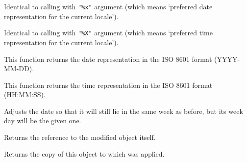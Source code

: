 


\label{wxdatetimeformatdate}


Identical to calling  with {\tt "\%x"}
argument (which means `preferred date representation for the current locale').


\label{wxdatetimeformattime}


Identical to calling  with {\tt "\%X"}
argument (which means `preferred time representation for the current locale').


\label{wxdatetimeformatisodate}


This function returns the date representation in the ISO 8601 format
(YYYY-MM-DD).


\label{wxdatetimeformatisotime}


This function returns the time representation in the ISO 8601 format
(HH:MM:SS).



\label{wxdatetimesettoweekdayinsameweek}


Adjusts the date so that it will still lie in the same week as before, but its
week day will be the given one.

Returns the reference to the modified object itself.


\label{wxdatetimegetweekdayinsameweek}


Returns the copy of this object to which
 was
applied.


